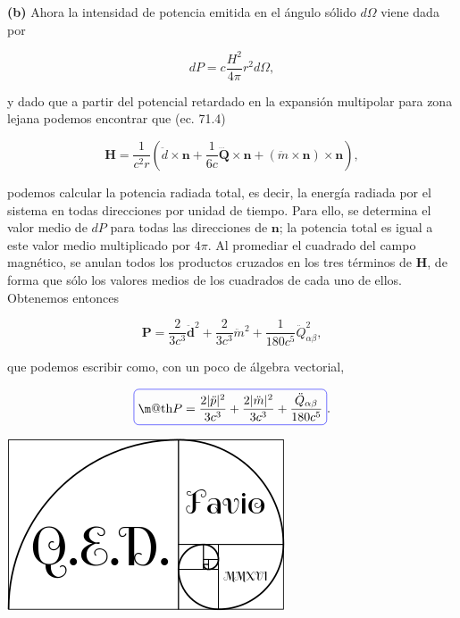 \documentclass[a4paper,11pt]{article}
\makeatletter
\numberwithin{equation}{section}
\newcommand*{\boxcolor}{blue}
\renewcommand{\boxed}[1]{\textcolor{\boxcolor}{%
\tikz[baseline={([yshift=-1ex]current bounding box.center)}] \node [rectangle, minimum width=1ex,rounded corners,draw] {\normalcolor\m@th$\displaystyle#1$};}}
\makeatother
\begin{document}
\textbf{(b)} Ahora la intensidad de potencia emitida en el ángulo sólido $d\Omega$ 
viene dada por 

\begin{equation}
 dP = c \frac{H^2}{4\pi}r^2 d\Omega,
\end{equation}

y dado que a partir del potencial retardado en la expansión multipolar para zona 
lejana podemos encontrar que (ec. 71.4) 

\begin{equation}
 \mathbf{H} = \frac{1}{c^2r}\left(\ddot{d} \times \mathbf{n} + 
 \frac{1}{6c}\dddot{\mathbf{Q}} \times \mathbf{n} + 
 (\ddot{m} \times \mathbf{n}) \times \mathbf{n}\right),
\end{equation}

podemos calcular la potencia radiada total, es decir, la energía radiada por el sistema 
en todas direcciones por unidad de tiempo. Para ello, se determina el valor medio 
de $dP$ para todas las direcciones de $\mathbf{n}$; la potencia total es igual 
a este valor medio multiplicado por $4\pi$. Al promediar el cuadrado del 
campo magnético, se anulan todos los productos cruzados en los tres términos de 
$\mathbf{H}$, de forma que sólo los valores medios de los cuadrados de cada uno de 
ellos. Obtenemos entonces 

\begin{equation}
 \mathbf{P} = \frac{2}{3c^3}\ddot{\mathbf{d}}^2 + \frac{2}{3c^3}\ddot{m}^2 + 
 \frac{1}{180c^5}\ddot{Q}^2_{\alpha\beta},
\end{equation}

que podemos escribir como, con un poco de álgebra vectorial, 

\begin{equation}
 \boxed{P = \frac{2|\ddot{p}|^2}{3c^3} + \frac{2|\ddot{m}|^2}{3c^3} +
 \frac{\ddot{Q}_{\alpha\beta}}{180c^5}}.
\end{equation}

\hspace{10cm}\includegraphics[scale=0.25]{logoQED}
\end{document}
